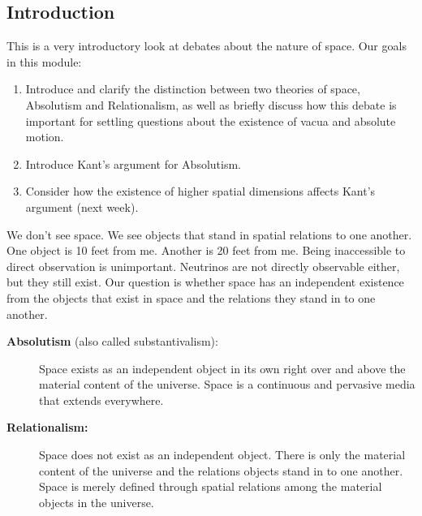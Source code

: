 \documentclass[oneside]{article}
\begin{document}
\thispagestyle{fancy}

\subsection*{Introduction}

This is a very introductory look at debates about the nature of space.
Our goals in this module:

\begin{enumerate}

\item
  Introduce and clarify the distinction between two theories of space,
  Absolutism and Relationalism, as well as briefly discuss how this
  debate is important for settling questions about the existence of
  vacua and absolute motion.
\item
  Introduce Kant's argument for Absolutism.
\item
  Consider how the existence of higher spatial dimensions affects Kant's
  argument (next week).
\end{enumerate}
We don't see space. We see objects that stand in spatial relations to
one another. One object is 10 feet from me. Another is 20 feet from me.
Being inaccessible to direct observation is unimportant. Neutrinos are
not directly observable either, but they still exist. Our question is
whether space has an independent existence from the objects that exist
in space and the relations they stand in to one another.

\begin{description}
\item[\textbf{Absolutism} (also called substantivalism):]
Space exists as an independent object in its own right over and above
the material content of the universe. Space is a continuous and
pervasive media that extends everywhere.
\item[\textbf{Relationalism:}]
Space does not exist as an independent object. There is only the
material content of the universe and the relations objects stand in to
one another. Space is merely defined through spatial relations among the
material objects in the universe.
\end{description}
\end{document}

